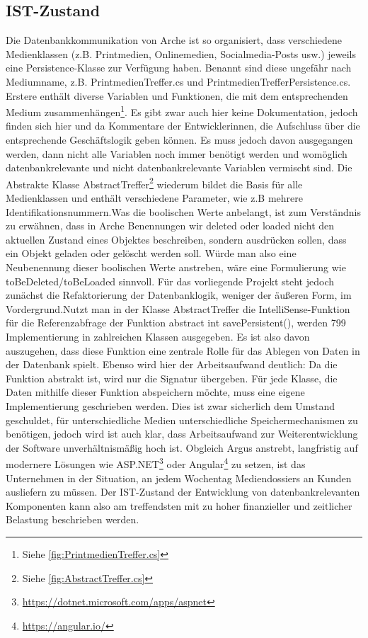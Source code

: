 \documentclass[11pt,toc=sectionentrywithoutdots, 
headheight=44pt, headings=optiontoheadandtoc, hyperfootnotes=false, hypertexnames=false]{scrartcl}
\newcommand\extendedref[1]{Siehe \ref{#1}}
\begin{document}
\subsection{IST-Zustand}
Die Datenbankkommunikation von Arche ist so organisiert, dass verschiedene Medienklassen (z.B. Printmedien, Onlinemedien, Socialmedia-Posts usw.) jeweils eine Persistence-Klasse zur Verfügung haben. Benannt sind diese ungefähr nach Mediumname, z.B. \glqq PrintmedienTreffer.cs\grqq{} und \glqq PrintmedienTrefferPersistence.cs\grqq{}. Erstere enthält diverse Variablen und Funktionen, die mit dem entsprechenden Medium zusammenhängen\footnote{\extendedref{fig:PrintmedienTreffer.cs}}. Es gibt zwar auch hier keine Dokumentation, jedoch finden sich hier und da Kommentare der Entwicklerinnen, die Aufschluss über die entsprechende Geschäftslogik geben können. Es muss jedoch davon ausgegangen werden, dann nicht alle Variablen noch immer benötigt werden und womöglich datenbankrelevante und nicht datenbankrelevante Variablen vermischt sind. Die \gls{Abstrakte Klasse} \glqq AbstractTreffer\grqq{}\footnote{\extendedref{fig:AbstractTreffer.cs}} wiederum bildet die Basis für alle Medienklassen und enthält verschiedene Parameter, wie z.B mehrere Identifikationsnummern.\newline Was die boolischen Werte anbelangt, ist zum Verständnis zu erwähnen, dass in Arche Benennungen wir \glqq deleted\grqq{} oder \glqq loaded\grqq{} nicht den aktuellen Zustand eines Objektes beschreiben, sondern ausdrücken sollen, dass ein Objekt geladen oder gelöscht werden soll. Würde man also eine Neubenennung dieser boolischen Werte anstreben, wäre eine Formulierung wie \glqq toBeDeleted/toBeLoaded\grqq{} sinnvoll. Für das vorliegende Projekt steht jedoch zunächst die \gls{Refaktorierung} der Datenbanklogik, weniger der äußeren Form, im Vordergrund.\newline\newline Nutzt man in der Klasse \glqq AbstractTreffer\grqq{} die IntelliSense-Funktion für die Referenzabfrage der Funktion \glqq abstract int savePersistent()\grqq{}, werden 799 Implementierung in zahlreichen Klassen ausgegeben. Es ist also davon auszugehen, dass diese Funktion eine zentrale Rolle für das Ablegen von Daten in der Datenbank spielt. Ebenso wird hier der Arbeitsaufwand deutlich: Da die Funktion abstrakt ist, wird nur die Signatur übergeben. Für jede Klasse, die Daten mithilfe dieser Funktion abspeichern möchte, muss eine eigene Implementierung geschrieben werden. Dies ist zwar sicherlich dem Umstand geschuldet, für unterschiedliche Medien unterschiedliche Speichermechanismen zu benötigen, jedoch wird ist auch klar, dass Arbeitsaufwand zur Weiterentwicklung der Software unverhältnismäßig hoch ist. Obgleich Argus anstrebt, langfristig auf modernere Lösungen wie ASP.NET\footnote{\href{https://dotnet.microsoft.com/apps/aspnet}{https://dotnet.microsoft.com/apps/aspnet}} oder Angular\footnote{\href{https://angular.io/}{https://angular.io/}} zu setzen, ist das Unternehmen in der Situation, an jedem Wochentag Mediendossiers an Kunden ausliefern zu müssen. Der IST-Zustand der Entwicklung von datenbankrelevanten Komponenten kann also am treffendsten mit zu hoher finanzieller und zeitlicher Belastung beschrieben werden.
\end{document}
